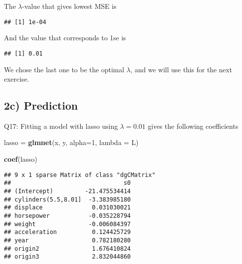 \documentclass[]{article}
\newenvironment{Shaded}{\begin{snugshade}}{\end{snugshade}}
\newcommand{\KeywordTok}[1]{\textcolor[rgb]{0.13,0.29,0.53}{\textbf{#1}}}
\newcommand{\DataTypeTok}[1]{\textcolor[rgb]{0.13,0.29,0.53}{#1}}
\newcommand{\DecValTok}[1]{\textcolor[rgb]{0.00,0.00,0.81}{#1}}
\newcommand{\StringTok}[1]{\textcolor[rgb]{0.31,0.60,0.02}{#1}}
\newcommand{\OperatorTok}[1]{\textcolor[rgb]{0.81,0.36,0.00}{\textbf{#1}}}
\newcommand{\NormalTok}[1]{#1}
\begin{document}
The \(\lambda\)-value that gives lowest MSE is

\begin{Shaded}
\end{Shaded}

\begin{verbatim}
## [1] 1e-04
\end{verbatim}

And the value that corresponds to 1se is

\begin{Shaded}
\end{Shaded}

\begin{verbatim}
## [1] 0.01
\end{verbatim}

We chose the last one to be the optimal \(\lambda\), and we will use
this for the next exercise.

\subsection{2c) Prediction}\label{c-prediction}

Q17: Fitting a model with lasso using \(\lambda = 0.01\) gives the
following coefficients

\begin{Shaded}
\begin{Highlighting}[]
\NormalTok{lasso =}\StringTok{ }\KeywordTok{glmnet}\NormalTok{(x, y, }\DataTypeTok{alpha=}\DecValTok{1}\NormalTok{, }\DataTypeTok{lambda =}\NormalTok{ L)}

\KeywordTok{coef}\NormalTok{(lasso)}
\end{Highlighting}
\end{Shaded}

\begin{verbatim}
## 9 x 1 sparse Matrix of class "dgCMatrix"
##                                s0
## (Intercept)         -21.475534414
## cylinders(5.5,8.01]  -3.383985180
## displace              0.031030021
## horsepower           -0.035228794
## weight               -0.006084397
## acceleration          0.124425729
## year                  0.782180280
## origin2               1.676410824
## origin3               2.832044860
\end{verbatim}
\end{document}
